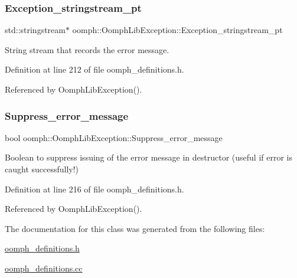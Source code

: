 \subsubsection{\texorpdfstring{Exception\+\_\+stringstream\+\_\+pt}{Exception\_stringstream\_pt}}
{\footnotesize\ttfamily std\+::stringstream$\ast$ oomph\+::\+Oomph\+Lib\+Exception\+::\+Exception\+\_\+stringstream\+\_\+pt\hspace{0.3cm}{\ttfamily [protected]}}



String stream that records the error message. 



Definition at line 212 of file oomph\+\_\+definitions.\+h.



Referenced by Oomph\+Lib\+Exception().

\mbox{\label{classoomph_1_1OomphLibException_ac374cd3358bf26639860a6778779786d}} 
\subsubsection{\texorpdfstring{Suppress\+\_\+error\+\_\+message}{Suppress\_error\_message}}
{\footnotesize\ttfamily bool oomph\+::\+Oomph\+Lib\+Exception\+::\+Suppress\+\_\+error\+\_\+message\hspace{0.3cm}{\ttfamily [protected]}}



Boolean to suppress issuing of the error message in destructor (useful if error is caught successfully!) 



Definition at line 216 of file oomph\+\_\+definitions.\+h.



Referenced by Oomph\+Lib\+Exception().



The documentation for this class was generated from the following files\+:\begin{DoxyCompactItemize}
\item 
\hyperlink{oomph__definitions_8h}{oomph\+\_\+definitions.\+h}\item 
\hyperlink{oomph__definitions_8cc}{oomph\+\_\+definitions.\+cc}\end{DoxyCompactItemize}
